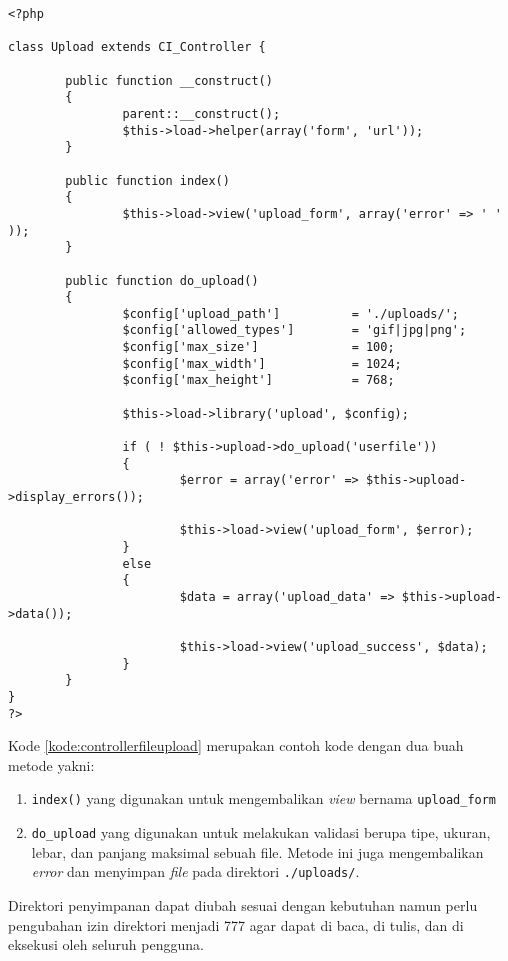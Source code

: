 \begin{lstlisting}[caption=Contoh \textit{controller} untuk melakukan validasi dan penyimpanan, label=kode:controllerfileupload]
<?php

class Upload extends CI_Controller {

        public function __construct()
        {
                parent::__construct();
                $this->load->helper(array('form', 'url'));
        }

        public function index()
        {
                $this->load->view('upload_form', array('error' => ' ' ));
        }

        public function do_upload()
        {
                $config['upload_path']          = './uploads/';
                $config['allowed_types']        = 'gif|jpg|png';
                $config['max_size']             = 100;
                $config['max_width']            = 1024;
                $config['max_height']           = 768;

                $this->load->library('upload', $config);

                if ( ! $this->upload->do_upload('userfile'))
                {
                        $error = array('error' => $this->upload->display_errors());

                        $this->load->view('upload_form', $error);
                }
                else
                {
                        $data = array('upload_data' => $this->upload->data());

                        $this->load->view('upload_success', $data);
                }
        }
}
?>
\end{lstlisting}

Kode \ref{kode:controllerfileupload} merupakan contoh kode dengan dua buah metode yakni:
\begin{enumerate}
\item \verb|index()| yang digunakan untuk mengembalikan \textit{view} bernama \texttt{upload\_form}
\item \verb|do_upload| yang digunakan untuk melakukan validasi berupa tipe, ukuran, lebar, dan panjang maksimal sebuah file. Metode ini juga mengembalikan \textit{error} dan menyimpan \textit{file} pada direktori \texttt{./uploads/}.
\end{enumerate}
Direktori penyimpanan dapat diubah sesuai dengan kebutuhan namun perlu pengubahan izin direktori menjadi 777 agar dapat di baca, di tulis, dan di eksekusi oleh seluruh pengguna.

